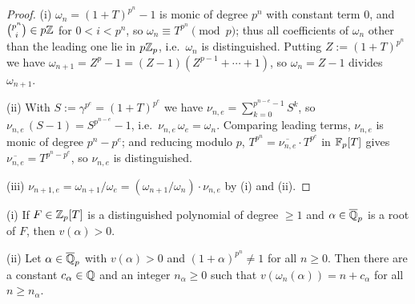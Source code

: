 \begin{proof}
\leanok
(i) $\omega_n=(1+T)^{p^n}-1$ is monic of degree $p^n$ with constant term $0$, and
$\binom{p^n}i\in p{\mathbb {Z}}$ for $0<i<p^n$, so $\omega_n\equiv T^{p^n}\pmod p$;
thus all coefficients of $\omega_n$ other than the leading one lie in $p{\mathbb {Z}}_p$,
i.e.~$\omega_n$ is distinguished.
Putting $Z:=(1+T)^{p^n}$ we have $\omega_{n+1}=Z^p-1=(Z-1)(Z^{p-1}+\cdots+1)$,
so $\omega_n=Z-1$ divides $\omega_{n+1}$.

(ii) With $S:=\gamma^{p^e}=(1+T)^{p^e}$ we have
$\nu_{n,e}=\sum_{k=0}^{p^{n-e}-1}S^k$, so
$\nu_{n,e}\,(S-1)=S^{p^{n-e}}-1$, i.e.~$\nu_{n,e}\,\omega_e=\omega_n$.
Comparing leading terms, $\nu_{n,e}$ is monic of degree $p^n-p^e$; and reducing
modulo $p$, $T^{p^n}=\overline{\nu_{n,e}}\cdot T^{p^e}$ in ${\mathbb {F}}_p[T]$ gives
$\overline{\nu_{n,e}}=T^{p^n-p^e}$, so $\nu_{n,e}$ is distinguished.

(iii) $\nu_{n+1,e}=\omega_{n+1}/\omega_e=(\omega_{n+1}/\omega_n)\cdot\nu_{n,e}$
by (i) and (ii).
\end{proof}

\begin{lem}
\label{omega-val-growth}
{\rm(i)} If $F\in{\mathbb {Z}}_p[T]$ is a distinguished polynomial of degree $\geq 1$ and
$\alpha\in\overline{{\mathbb {Q}}}_p$ is a root of $F$, then $v(\alpha)>0$.

{\rm(ii)} Let $\alpha\in\overline{{\mathbb {Q}}}_p$ with $v(\alpha)>0$ and
$(1+\alpha)^{p^n}\neq 1$ for all $n\geq 0$. Then there are a constant
$c_\alpha\in{\mathbb {Q}}$ and an integer $n_\alpha\geq 0$ such that
$v(\omega_n(\alpha))=n+c_\alpha$ for all $n\geq n_\alpha$.
\end{lem}

